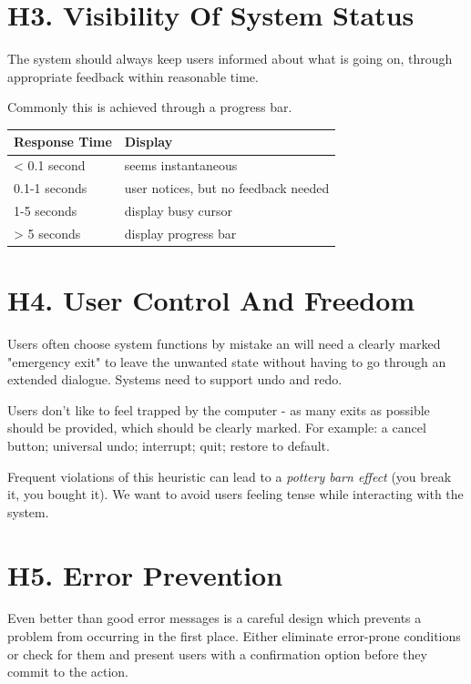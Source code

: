 \section*{H3. Visibility Of System Status}
The system should always keep users informed about what is going on, through appropriate feedback within reasonable time. 

Commonly this is achieved through a progress bar.

\begin{table}[H]
    \centering
    \begin{tabular}{p{} p{}}
        \textbf{Response Time} & \textbf{Display}\\
        \hline
        \hline
        < 0.1 second & seems instantaneous\\
        \hline
        0.1-1 seconds & user notices, but no feedback needed\\
        \hline
        1-5 seconds & display busy cursor\\
        \hline
        > 5 seconds & display progress bar\\
        \hline        
    \end{tabular}
\end{table}

\section*{H4. User Control And Freedom}
Users often choose system functions by mistake an will need a clearly marked "emergency exit" to leave the unwanted state without having to go through an extended dialogue. Systems need to support undo and redo.

Users don't like to feel trapped by the computer - as many exits as possible should be provided, which should be clearly marked. For example: a cancel button; universal undo; interrupt; quit; restore to default. 

Frequent violations of this heuristic can lead to a \textit{pottery barn effect} (you break it, you bought it). We want to avoid users feeling tense while interacting with the system.

\section*{H5. Error Prevention}
Even better than good error messages is a careful design which prevents a problem from occurring in the first place. Either eliminate error-prone conditions or check for them and present users with a confirmation option before they commit to the action. 

